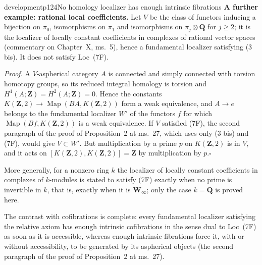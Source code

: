\begin{dcomment}{development}{p124}{No homology localizer has enough intrinsic fibrations}
\textbf{A further example: rational local coefficients.}\ours
Let $V$ be the class of functors inducing a bijection on $\pi_0$, isomorphisms on $\pi_1$ and isomorphisms on $\pi_j\otimes\mathbf Q$ for $j\geq2$; it is the localizer of locally constant coefficients in complexes of rational vector spaces (commentary on Chapter~X, ms.~5), hence a fundamental localizer satisfying (3 bis). It does not satisfy Loc~(7F).

\textit{Proof.} A $V$-aspherical category $A$ is connected and simply connected with torsion homotopy groups, so its reduced integral homology is torsion and $H^1(A;\mathbf Z)=H^2(A;\mathbf Z)=0$. Hence the constants $K(\mathbf Z,2)\to\operatorname{Map}(BA,K(\mathbf Z,2))$ form a weak equivalence, and $A\to e$ belongs to the fundamental localizer $W'$ of the functors $f$ for which $\operatorname{Map}(Bf,K(\mathbf Z,2))$ is a weak equivalence. If $V$ satisfied (7F), the second paragraph of the proof of Proposition~2 at ms.~27, which uses only (3 bis) and (7F), would give $V\subset W'$. But multiplication by a prime $p$ on $K(\mathbf Z,2)$ is in $V$, and it acts on $[K(\mathbf Z,2),K(\mathbf Z,2)]=\mathbf Z$ by multiplication by $p$.\hfill$\square$

More generally, for a nonzero ring $k$ the localizer of locally constant coefficients in complexes of $k$-modules is stated to satisfy (7F) exactly when no prime is invertible in $k$, that is, exactly when it is $\mathbf W_\infty$; only the case $k=\mathbf Q$ is proved here.

The contrast with cofibrations is complete: every fundamental localizer satisfying the relative axiom has enough intrinsic cofibrations in the sense dual to Loc~(7F) as soon as it is accessible, whereas enough intrinsic fibrations force it, with or without accessibility, to be generated by its aspherical objects (the second paragraph of the proof of Proposition~2 at ms.~27).
\end{dcomment}
